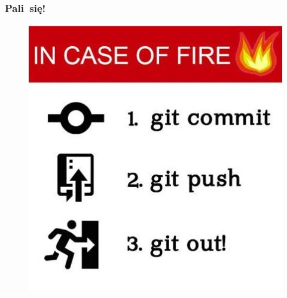 \documentclass[10pt,t]{beamer}
\begin{document}
\begin{frame}
  \frametitle{Pali~się!}


  \begin{figure}

    \centering


    \includegraphics[scale=0.45]
    {./PresentationsPictures/In-the-case-of-fire.png}

  \end{figure}

\end{frame}
\end{document}
